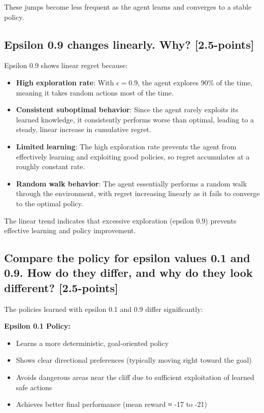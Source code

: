\documentclass[12pt]{article}
\begin{document}
{{{These jumps become less frequent as the agent learns and converges to a stable policy.

\subsection{Epsilon 0.9 changes linearly. Why? [2.5-points]}

Epsilon 0.9 shows linear regret because:

\begin{itemize}
    \item \textbf{High exploration rate}: With $\epsilon = 0.9$, the agent explores 90\% of the time, meaning it takes random actions most of the time.
    \item \textbf{Consistent suboptimal behavior}: Since the agent rarely exploits its learned knowledge, it consistently performs worse than optimal, leading to a steady, linear increase in cumulative regret.
    \item \textbf{Limited learning}: The high exploration rate prevents the agent from effectively learning and exploiting good policies, so regret accumulates at a roughly constant rate.
    \item \textbf{Random walk behavior}: The agent essentially performs a random walk through the environment, with regret increasing linearly as it fails to converge to the optimal policy.
\end{itemize}

The linear trend indicates that excessive exploration (epsilon 0.9) prevents effective learning and policy improvement.

\subsection{Compare the policy for epsilon values 0.1 and 0.9. How do they differ, and why do they look different? [2.5-points]}

The policies learned with epsilon 0.1 and 0.9 differ significantly:

\textbf{Epsilon 0.1 Policy:}
\begin{itemize}
    \item Learns a more deterministic, goal-oriented policy
    \item Shows clear directional preferences (typically moving right toward the goal)
    \item Avoids dangerous areas near the cliff due to sufficient exploitation of learned safe actions
    \item Achieves better final performance (mean reward ≈ -17 to -21)
\end{itemize}

}}}
\end{document}
